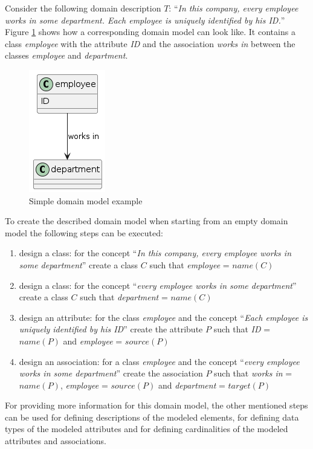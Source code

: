 Consider the following domain description $T$: ``\textit{In this company, every employee works in some department. Each employee is uniquely identified by his ID.}'' Figure \ref{fig:simple-employee-domain-model} shows how a corresponding domain model can look like. It contains a class \textit{employee} with the attribute \textit{ID} and the association \textit{works in} between the classes \textit{employee} and \textit{department}.

\begin{figure}[!h]
    \centering
    \includegraphics[scale=0.65]{img/domain-modeling-steps-example.png}
    \caption{\centering Simple domain model example}
    \label{fig:simple-employee-domain-model}
\end{figure}

To create the described domain model when starting from an empty domain model the following steps can be executed:

\begin{enumerate}
\item design a class: for the concept ``\textit{In this company, every employee works in some department}'' create a class $C$ such that \textit{employee} = $name(C)$
\item design a class: for the concept ``\textit{every employee works in some department}'' create a class $C$ such that \textit{department} = $name(C)$
\item design an attribute: for the class \textit{employee} and the concept ``\textit{Each employee is uniquely identified by his ID}'' create the attribute $P$ such that \textit{ID} = $name(P)$ and \textit{employee} = $source(P)$
\item design an association: for a class \textit{employee} and the concept ``\textit{every employee works in some department}'' create the association $P$ such that \textit{works in} = $name(P)$, \textit{employee} = $source(P)$ and \textit{department} = $target(P)$
\end{enumerate}

For providing more information for this domain model, the other mentioned steps can be used for defining descriptions of the modeled elements, for defining data types of the modeled attributes and for defining cardinalities of the modeled attributes and associations.